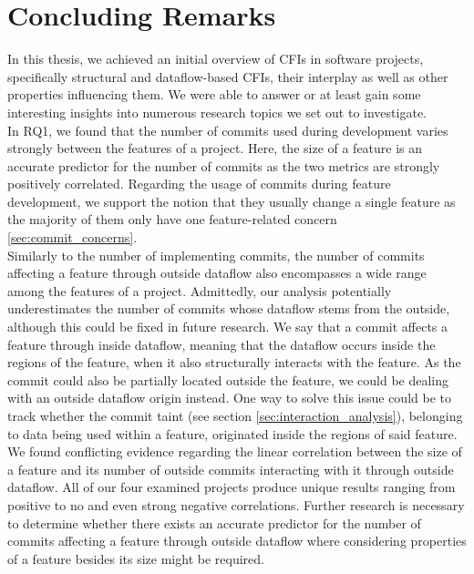\chapter{Concluding Remarks}\label{ch:conclusion}

In this thesis, we achieved an initial overview of CFIs in software projects, specifically structural and dataflow-based CFIs, their interplay as well as other properties influencing them.
We were able to answer or at least gain some interesting insights into numerous research topics we set out to investigate. \\
In RQ1, we found that the number of commits used during development varies strongly between the features of a project.
Here, the size of a feature is an accurate predictor for the number of commits as the two metrics are strongly positively correlated.
Regarding the usage of commits during feature development, we support the notion that they usually change a single feature as the majority of them only have one feature-related concern \ref{sec:commit_concerns}. \\
Similarly to the number of implementing commits, the number of commits affecting a feature through outside dataflow also encompasses a wide range among the features of a project.
Admittedly, our analysis potentially underestimates the number of commits whose dataflow stems from the outside, although this could be fixed in future research.
We say that a commit affects a feature through inside dataflow, meaning that the dataflow occurs inside the regions of the feature, when it also structurally interacts with the feature.
As the commit could also be partially located outside the feature, we could be dealing with an outside dataflow origin instead.
One way to solve this issue could be to track whether the commit taint (see section \ref{sec:interaction_analysis}), belonging to data being used within a feature, originated inside the regions of said feature. \\
We found conflicting evidence regarding the linear correlation between the size of a feature and its number of outside commits interacting with it through outside dataflow.
All of our four examined projects produce unique results ranging from positive to no and even strong negative correlations.
Further research is necessary to determine whether there exists an accurate predictor for the number of commits affecting a feature through outside dataflow where considering properties of a feature besides its size might be required.

